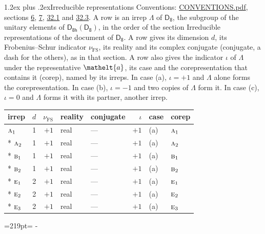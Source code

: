 \documentclass[10pt,a4paper]{article}
\makeatletter
\renewcommand\section{\@startsection{section}{1}{\z@}{-3ex plus -1ex minus -.2ex}%
  {1.2ex plus .2ex}{\normalfont\large\sffamily\bfseries\color{parttitle}}}
\newcommand{\needspace}[1]{\par\penalty-100\begingroup\dimen0=#1\relax\dimen2=\pagegoal
  \advance\dimen2-\pagetotal\ifdim\dimen0>\dimen2\relax\ifdim\dimen2>0pt\vfil\break\fi\fi
  \endgroup}
\numberwithin{equation}{section}
\newcommand{\eltfont}[1]{{\let\sigma\eltsigma\mathelt{#1}}}
\newcommand{\grp}[1]{\mathsf{#1}}
\newcommand{\irr}[1]{\text{\normalfont\scshape #1}}
\newcommand{\elt}[1]{\eltfont{#1}}
\newcommand{\fsind}{\nu_{\mathrm{FS}}}
\makeatother
\begin{document}
\section{Irreducible representations}\label{s:irreps}
Conventions: \href{../../CONVENTIONS.pdf}{CONVENTIONS.pdf}, sections \href{../../../rotation/CONVENTIONS.pdf\#conv.6}{6}, \href{../../../rotation/CONVENTIONS.pdf\#conv.7}{7}, \href{../../CONVENTIONS.pdf\#conv.32.1}{32.1} and \href{../../CONVENTIONS.pdf\#conv.32.3}{32.3}.
\leavevmode\label{n:irrep.Delta}A row is an irrep $\Lambda$ of $\grp{D_{8}}$, the subgroup of the unitary elements of $\grp{D_{8h}}(\grp{D_{8}})$, in the order of the section Irreducible representations of the document of \href{../../../rotation/data/pdf/D8.pdf}{$\grp{D_{8}}$}. \label{n:index.dimension}\label{n:index.frobenius}\label{n:head.irrep}\label{n:head.reality}\label{n:head.conjugate}A row gives its dimension $d$, its Frobenius--Schur indicator $\fsind$, its reality and its complex conjugate (conjugate, a dash for the others), as in that section. \label{n:head.case.corep}\label{n:head.corep}A row also gives the indicator $\iota$ of $\Lambda$ under the representative $\elt{a}$, its case and the corepresentation that contains it (corep), named by its irreps. In case (a), $\iota = +1$ and $\Lambda$ alone forms the corepresentation. In case (b), $\iota = -1$ and two copies of $\Lambda$ form it. In case (c), $\iota = 0$ and $\Lambda$ forms it with its partner, another irrep.
\setlength{\emergencystretch}{2em}\par\setlength{\emergencystretch}{0pt}
{\small\renewcommand{\arraystretch}{1.25}\setlength{\tabcolsep}{4pt}\begin{longtable}{@{}lrrllrll@{}}\toprule
irrep & $d$ & $\fsind$ & reality & conjugate & $\iota$ & case & corep\\\midrule\endhead
\bottomrule\endfoot\endlastfoot
$\irr{a}_{1}$ & 1 & $+1$ & real & --- & $+1$ & (a) & $\irr{a}_{1}$\\*
$\irr{a}_{2}$ & 1 & $+1$ & real & --- & $+1$ & (a) & $\irr{a}_{2}$\\*
$\irr{b}_{1}$ & 1 & $+1$ & real & --- & $+1$ & (a) & $\irr{b}_{1}$\\*
$\irr{b}_{2}$ & 1 & $+1$ & real & --- & $+1$ & (a) & $\irr{b}_{2}$\\*
$\irr{e}_{1}$ & 2 & $+1$ & real & --- & $+1$ & (a) & $\irr{e}_{1}$\\*
$\irr{e}_{2}$ & 2 & $+1$ & real & --- & $+1$ & (a) & $\irr{e}_{2}$\\*
$\irr{e}_{3}$ & 2 & $+1$ & real & --- & $+1$ & (a) & $\irr{e}_{3}$\\
\bottomrule\end{longtable}}
\needspace{219pt}
\end{document}
